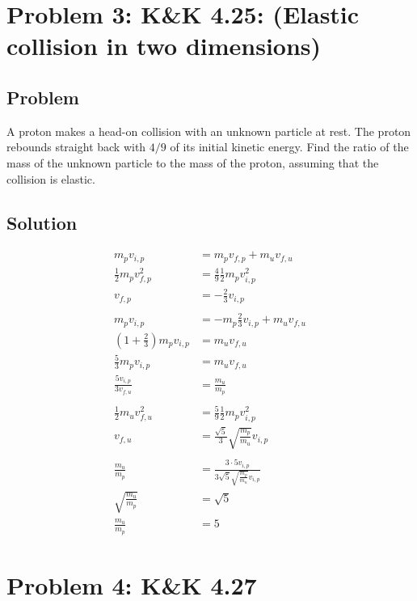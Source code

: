 \documentclass[solutions]{esg8012pset}
\begin{document}
\section*{Problem 3: K\&K 4.25: (Elastic collision in two dimensions)}
\subsection*{Problem}
  A proton makes a head-on collision with an unknown particle at rest. The proton rebounds straight back with $4 / 9$ of its initial kinetic energy. Find the ratio of the mass of the unknown particle to the mass of the proton, assuming that the collision is elastic.
\subsection*{Solution}
  \begin{align*}
  m_p v_{i, p} & = m_p v_{f,p} + m_u v_{f, u} \\
  \frac{1}{2}m_p v_{f, p}^2 & = \frac{4}{9} \frac{1}{2}m_p v_{i, p}^2 \\
  v_{f, p} & = -\frac{2}{3}v_{i, p} \\
  \\
  m_p v_{i, p} & = -m_p \frac{2}{3}v_{i, p} + m_u v_{f, u} \\
  \left(1 + \frac{2}{3}\right)m_p v_{i, p} & = m_u v_{f, u} \\
  \frac{5}{3}m_p v_{i, p} & = m_u v_{f, u} \\
  \frac{5v_{i, p}}{3v_{f, u}} & = \frac{m_u}{m_p} \\
  \\
  \frac{1}{2}m_u v_{f, u}^2 & = \frac{5}{9}\frac{1}{2}m_p v_{i, p}^2 \\
  v_{f, u} & = \frac{\sqrt{5}}{3}\sqrt{\frac{m_p}{m_u}} v_{i, p} \\
  \\
  \frac{m_u}{m_p} & = \frac{3\cdot 5 v_{i, p}}{3\sqrt{5}\sqrt{\frac{m_p}{m_u}} v_{i, p}}  \\
  \sqrt{\frac{m_u}{m_p}} & = \sqrt{5}  \\
  \frac{m_u}{m_p} & = 5
  \end{align*}
\section*{Problem 4: K\&K 4.27}
\end{document}
